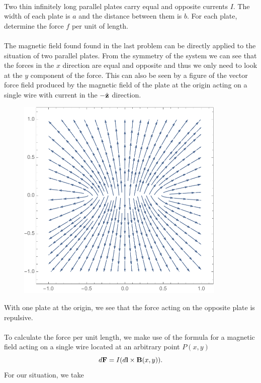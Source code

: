 \documentclass[11pt,letterpaper]{article}
\begin{document}
	\\
	\item
	Two thin infinitely long parallel plates carry equal and opposite currents $I$. The width of each plate is $a$ and the distance
	between them is $b$. For each plate, determine the force $f$ per unit of length.
	\\
	\\
	The magnetic field found found in the last problem can be directly applied to the situation of two parallel plates. From the symmetry of the 
	system we can see that the forces in the $x$ direction are equal and opposite and thus we only need to look 
	at the $y$ component of the force. This can also be seen by a figure of the vector force field produced by the magnetic field of the plate 
	at the origin acting on a single wire with current in the $-\hat{\mathbf{z}}$ direction. 
	\\
		\begin{figure}[H]
			\centering
			\includegraphics[width=100mm]{3_HW5.pdf}
		\end{figure}
	With one plate at the origin, we see that the force acting on the opposite plate is repulsive. 
	\\
	\\
	To calculate the force per unit length, we make use of the formula for a magnetic field acting on a single wire located
	at an arbitrary point $P(x,y)$
	\[
		d\mathbf{F} = I(d\mathbf{l}\times \mathbf{B}(x,y)).
	\]
	For our situation, we take
\end{document}
